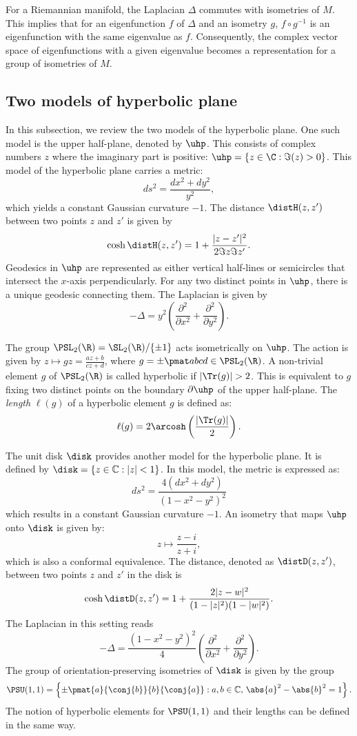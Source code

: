 For a Riemannian manifold, the Laplacian $\Delta$ commutes with isometries of $M$.
This implies that for an eigenfunction $f$ of $\Delta$ and an isometry $g$, 
$f\circ g^{-1}$ is an eigenfunction with the same eigenvalue as $f$.
Consequently, the complex vector space of eigenfunctions with a given eigenvalue becomes a representation for a group of isometries of $M$.


\subsection{Two models of hyperbolic plane}
In this subsection, we review the two models of the hyperbolic plane. 
One such model is the upper half-plane, denoted by \( \uhp \). This consists of complex numbers \( z \) where the imaginary part is positive: \( \uhp = \{ z \in \C : \Im(z) > 0 \} \).
This model of the hyperbolic plane carries a metric:
\[ ds^2 = \frac{dx^2 + dy^2}{y^2},\]
which yields a constant Gaussian curvature $-1$.
The distance $\distH(z,z')$ between two points $z$ and $z'$ is given by 
\[
\cosh \distH(z,z') = 1 + \frac{|z-z'|^2}{2\Im z \Im z'}.
\]
Geodesics in \( \uhp \) are represented as either vertical half-lines or semicircles that intersect the $x$-axis perpendicularly.
For any two distinct points in \( \uhp \), there is a unique geodesic connecting them. 
The Laplacian is given by
\[ -\Delta = y^2 \left( \frac{\partial^2}{\partial x^2} + \frac{\partial^2}{\partial y^2} \right). \]

The group \(\PSL_2(\R)=\SL_2(\R)/\{\pm 1\}\) acts isometrically on \(\uhp\).
The action is given by \(z \mapsto gz = \frac{az+b}{cz+d}\), where \(g = \pm \pmat abcd \in\PSL_2(\R)\).
A non-trivial element \( g \) of \( \PSL_2(\R) \) is called hyperbolic if
$|\Tr(g)| > 2$.
This is equivalent to 
\( g \) fixing two distinct points on the boundary \( \partial \uhp\) of the upper half-plane.
The \textit{length} \( \ell(g) \) of a hyperbolic element \( g \) is defined as:
\[
\ell(g) = 2 \arcosh\left(\frac{|\Tr(g)|}{2}\right).
\]

The unit disk \( \disk \) provides another model for the hyperbolic plane.
It is defined by \( \disk = \{ z \in \mathbb{C} : |z| < 1 \} \).
In this model, the metric is expressed as:
\[ ds^2 = \frac{4(dx^2 + dy^2)}{(1 - x^2 - y^2)^2}\]
which results in a constant Gaussian curvature $-1$.
An isometry that maps \( \uhp \) onto \( \disk \) is given by:
\[
z \mapsto \frac{z-i}{z+i},
\]
which is also a conformal equivalence.
The distance, denoted as $\distD(z,z')$, between two points $z$ and $z'$ in the disk is
\[
\cosh \distD(z,z') = 1 + \frac{2|z-w|^2}{(1-|z|^2)(1-|w|^2)}.
\]
The Laplacian in this setting reads
\[ -\Delta = \frac{(1 - x^2 - y^2)^2}{4} \left( \frac{\partial^2}{\partial x^2} + \frac{\partial^2}{\partial y^2} \right). \]
The group of orientation-preserving isometries of \(\disk\) is given by the group 
\[ \PSU(1,1) = \left\{\pm \pmat{a}{\conj{b}}{b}{\conj{a}} : a, b \in \mathbb{C},\, \abs{a}^{2}-\abs{b}^{2}=1 \right\}. \]
The notion of hyperbolic elements for $\PSU(1,1)$ and their lengths can be defined in the same way.


